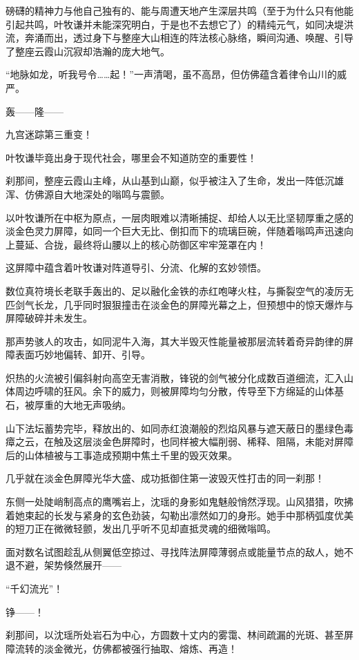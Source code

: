 磅礴的精神力与他自己独有的、能与周遭天地产生深层共鸣（至于为什么只有他能引起共鸣，叶牧谦并未能深究明白，于是也不去想它了）的精纯元气，如同决堤洪流，奔涌而出，透过身下与整座大山相连的阵法核心脉络，瞬间沟通、唤醒、引导了整座云霞山沉寂却浩瀚的庞大地气。

“地脉如龙，听我号令……起！”一声清喝，虽不高昂，但仿佛蕴含着律令山川的威严。

轰——隆——

九宫迷踪第三重变！

叶牧谦毕竟出身于现代社会，哪里会不知道防空的重要性！

刹那间，整座云霞山主峰，从山基到山巅，似乎被注入了生命，发出一阵低沉雄浑、仿佛源自大地深处的嗡鸣与震颤。

以叶牧谦所在中枢为原点，一层肉眼难以清晰捕捉、却给人以无比坚韧厚重之感的淡金色灵力屏障，如同一个巨大无比、倒扣而下的琉璃巨碗，伴随着嗡鸣声迅速向上蔓延、合拢，最终将山腰以上的核心防御区牢牢笼罩在内！

这屏障中蕴含着叶牧谦对阵道导引、分流、化解的玄妙领悟。

数位真符境长老联手轰出的、足以融化金铁的赤红咆哮火柱，与撕裂空气的凌厉无匹剑气长龙，几乎同时狠狠撞击在淡金色的屏障光幕之上，但预想中的惊天爆炸与屏障破碎并未发生。

那声势骇人的攻击，如同泥牛入海，其大半毁灭性能量被那层流转着奇异韵律的屏障表面巧妙地偏转、卸开、引导。

炽热的火流被引偏斜射向高空无害消散，锋锐的剑气被分化成数百道细流，汇入山体周边呼啸的狂风。余下的威力，则被屏障均匀分散，传导至下方绵延的山体基石，被厚重的大地无声吸纳。

山下法坛蓄势完毕，释放出的、如同赤红浪潮般的烈焰风暴与遮天蔽日的墨绿色毒瘴之云，在触及这层淡金色屏障时，也同样被大幅削弱、稀释、阻隔，未能对屏障后的山体植被与工事造成预期中焦土千里的毁灭效果。

几乎就在淡金色屏障光华大盛、成功抵御住第一波毁灭性打击的同一刹那！

东侧一处陡峭制高点的鹰嘴岩上，沈瑶的身影如鬼魅般悄然浮现。山风猎猎，吹拂着她束起的长发与紧身的玄色劲装，勾勒出凛然如刀的身形。她手中那柄弧度优美的短刀正在微微轻颤，发出几乎听不见却直抵灵魂的细微嗡鸣。

面对数名试图趁乱从侧翼低空掠过、寻找阵法屏障薄弱点或能量节点的敌人，她不退不避，架势倏然展开——

“千幻流光”！

铮——！

刹那间，以沈瑶所处岩石为中心，方圆数十丈内的雾霭、林间疏漏的光斑、甚至屏障流转的淡金微光，仿佛都被强行抽取、熔炼、再造！

